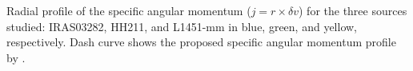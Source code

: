 Radial profile of the specific angular momentum ($j=r \times \delta v$) for the three sources studied: 
IRAS03282, HH211, and L1451-mm in blue, green, and yellow, respectively. 
Dash curve shows the proposed specific angular momentum profile by \cite{Belloche_2013}. 

  